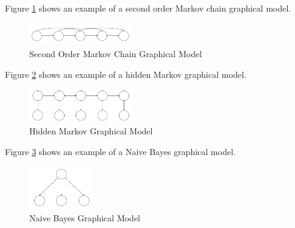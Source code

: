 \documentclass{article}
\begin{document}
\begin{example}
Figure \ref{fig:nb7} shows an example of a second order Markov chain graphical model.
\begin{figure}[!ht]
    \centering
    \includegraphics[width = 0.4\textwidth]{nb7.png}
    \caption{Second Order Markov Chain Graphical Model}
    \label{fig:nb7}
\end{figure}
\end{example}

\begin{example}
Figure \ref{fig:nb8} shows an example of a hidden Markov graphical model.
\begin{figure}[!ht]
    \centering
    \includegraphics[width = 0.4\textwidth]{nb8.png}
    \caption{Hidden Markov Graphical Model}
    \label{fig:nb8}
\end{figure}
\end{example}

\begin{example}
Figure \ref{fig:nb9} shows an example of a Naive Bayes graphical model.
\begin{figure}[!ht]
    \centering
    \includegraphics[width = 0.25\textwidth]{nb9.png}
    \caption{Naive Bayes Graphical Model}
    \label{fig:nb9}
\end{figure}
\end{example}
\FloatBarrier
\end{document}
